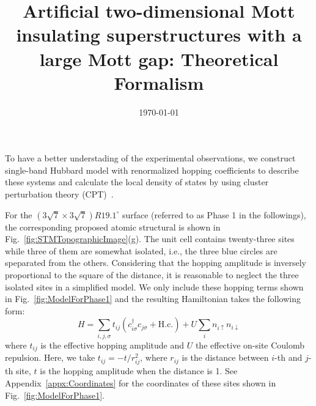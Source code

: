 \documentclass[aps,prb,reprint,amsfonts,amsmath,amssymb,showpacs,groupedaddress,superscriptaddress]{revtex4-1}
\begin{document}
\title{Artificial two-dimensional Mott insulating superstructures with a large Mott gap: Theoretical Formalism}

\date{\today}

\maketitle

To have a better understading of the experimental observations, we construct single-band Hubbard model with renormalized hopping coefficients to describe these systems and calculate the local density of states by using cluster perturbation theory (CPT)~\cite{PhysRevB.48.418,PhysRevLett.84.522}.

For the $(3\sqrt{7} \times 3\sqrt{7})R19.1^\circ$ surface (referred to as Phase 1 in the followings), the corresponding proposed atomic structural is shown in Fig.~\ref{fig:STMTopographicImage}(g). The unit cell contains twenty-three sites while three of them are somewhat isolated, i.e., the three blue circles are speparated from the others. Considering that the hopping amplitude is inversely proportional to the square of the distance, it is reasonable to neglect the three isolated sites in a simplified model. We only include these hopping terms shown in Fig.~\ref{fig:ModelForPhase1} and the resulting Hamiltonian takes the following form:
\begin{equation}
    H = \sum_{i,j,\sigma} t_{ij}(c_{i\sigma}^{\dagger}c_{j\sigma} + \text{H.c.}) + U \sum_{i} n_{i\uparrow} n_{i\downarrow}
    \label{eq:ModelHamiltonian}
\end{equation}
where $t_{ij}$ is the effective hopping amplitude and $U$ the effective on-site Coulomb repulsion. Here, we take $t_{ij} = -t/r_{ij}^{2}$, where $r_{ij}$ is the distance between $i$-th and $j$-th site, $t$ is the hopping amplitude when the distance is 1. See Appendix~\ref{appx:Coordinates} for the coordinates of these sites shown in Fig.~\ref{fig:ModelForPhase1}.
\end{document}
